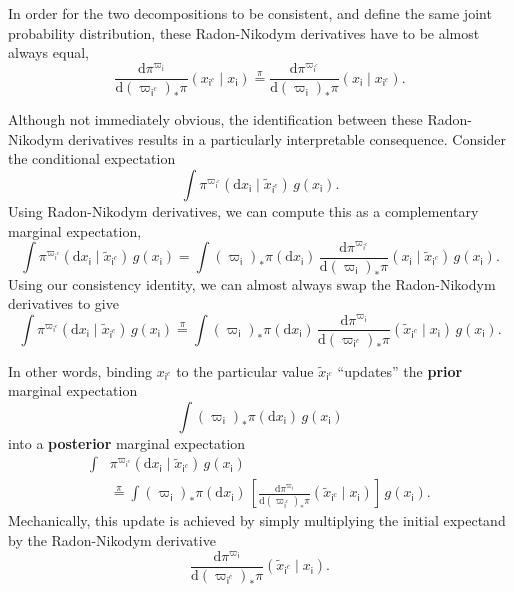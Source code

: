 \documentclass[
  letterpaper,
  DIV=11,
  numbers=noendperiod]{scrartcl}
\begin{document}
In order for the two decompositions to be consistent, and define the
same joint probability distribution, these Radon-Nikodym derivatives
have to be almost always equal, \[
\frac{
  \mathrm{d} \pi^{ \varpi_{\mathsf{i}} }
}{
  \mathrm{d} ( \varpi_{ \mathsf{i}^{c} } )_{*} \pi
}
( x_{ \mathsf{i}^{c} } \mid
  x_{\mathsf{i}} )
\overset{ \pi }{=}
\frac{
  \mathrm{d} \pi^{ \varpi_{ \mathsf{i}^{c} } }
}{
  \mathrm{d} ( \varpi_{ \mathsf{i} } )_{*} \pi
}
( x_{ \mathsf{i} } \mid
  x_{ \mathsf{i}^{c} } ).
\]

Although not immediately obvious, the identification between these
Radon-Nikodym derivatives results in a particularly interpretable
consequence. Consider the conditional expectation \[
\int
\pi^{ \varpi_{ \mathsf{i}^{c} } } (
  \mathrm{d} x_{ \mathsf{i} } \mid
  \tilde{x}_{ \mathsf{i}^{c} }
) \,
g ( x_{ \mathsf{i} } ).
\] Using Radon-Nikodym derivatives, we can compute this as a
complementary marginal expectation, \[
\int
\pi^{ \varpi_{ \mathsf{i}^{c} } } (
  \mathrm{d} x_{ \mathsf{i} } \mid
  \tilde{x}_{ \mathsf{i}^{c} }
) \,
g ( x_{ \mathsf{i} } )
=
\int
( \varpi_{ \mathsf{i} } )_{*} \pi (
  \mathrm{d} x_{ \mathsf{i} } ) \,
\frac{
  \mathrm{d} \pi^{ \varpi_{ \mathsf{i}^{c} } }
}{
  \mathrm{d} ( \varpi_{ \mathsf{i} } )_{*} \pi
}
( x_{ \mathsf{i} } \mid
  \tilde{x}_{ \mathsf{i}^{c} }
) \,
g ( x_{ \mathsf{i} } ).
\] Using our consistency identity, we can almost always swap the
Radon-Nikodym derivatives to give \[
\int
\pi^{ \varpi_{ \mathsf{i}^{c} } } (
  \mathrm{d} x_{ \mathsf{i} } \mid
  \tilde{x}_{ \mathsf{i}^{c} }
) \,
g ( x_{ \mathsf{i} } )
\overset{ \pi }{=}
\int
( \varpi_{ \mathsf{i} } )_{*} \pi (
  \mathrm{d} x_{ \mathsf{i} } ) \,
\frac{
  \mathrm{d} \pi^{ \varpi_{\mathsf{i}} }
}{
  \mathrm{d} ( \varpi_{ \mathsf{i}^{c} } )_{*} \pi
}
( \tilde{x}_{ \mathsf{i}^{c} } \mid
  x_{\mathsf{i}}
) \,
g ( x_{ \mathsf{i} } ).
\]

In other words, binding \(x_{ \mathsf{i}^{c} }\) to the particular value
\(\tilde{x}_{ \mathsf{i}^{c} }\) ``updates'' the \textbf{prior} marginal
expectation \[
\int
( \varpi_{ \mathsf{i} } )_{*} \pi (
  \mathrm{d} x_{ \mathsf{i} } ) \,
g ( x_{ \mathsf{i} } )
\] into a \textbf{posterior} marginal expectation \begin{align*}
\int
&\pi^{ \varpi_{ \mathsf{i}^{c} } } (
  \mathrm{d} x_{ \mathsf{i} } \mid
  \tilde{x}_{ \mathsf{i}^{c} }
) \,
g ( x_{ \mathsf{i} } )
\\
&\overset{ \pi }{=}
\int
( \varpi_{ \mathsf{i} } )_{*} \pi (
  \mathrm{d} x_{ \mathsf{i} } ) \,
\left[
  \frac{
    \mathrm{d} \pi^{ \varpi_{\mathsf{i}} }
  }{
    \mathrm{d} ( \varpi_{ \mathsf{i}^{c} } )_{*} \pi
  }
  ( \tilde{x}_{ \mathsf{i}^{c} } \mid
    x_{\mathsf{i}}
  )
\right]
\,
g ( x_{ \mathsf{i} } ).
\end{align*} Mechanically, this update is achieved by simply multiplying
the initial expectand by the Radon-Nikodym derivative \[
\frac{
  \mathrm{d} \pi^{ \varpi_{\mathsf{i}} }
}{
  \mathrm{d} ( \varpi_{ \mathsf{i}^{c} } )_{*} \pi
}
( \tilde{x}_{ \mathsf{i}^{c} } \mid
  x_{\mathsf{i}}
).
\]
\end{document}
